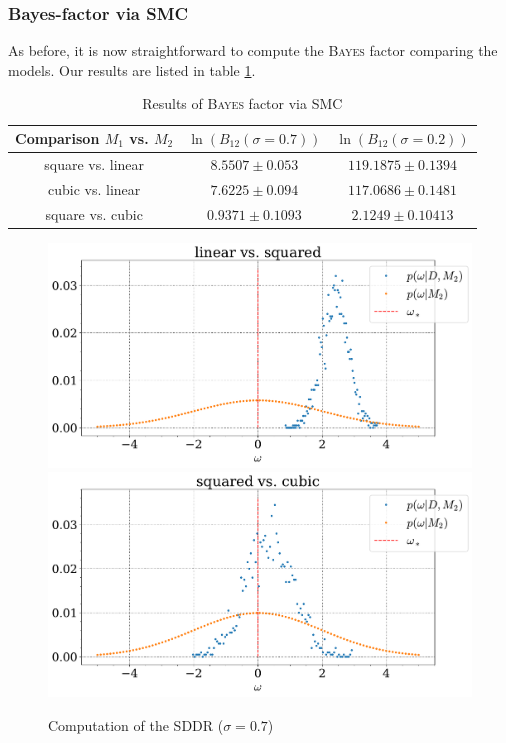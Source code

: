 \documentclass[%
 reprint,
 amsmath,amssymb,
 aps,
]{revtex4-1}
\begin{document}
\subsubsection{\textbf{Bayes-factor via SMC}}
\noindent As before, it is now straightforward to compute the \textsc{Bayes} factor comparing the models. Our results are listed in table \ref{tab:res_smc}.

\begin{table}[H]
	{\renewcommand{\arraystretch}{1.3}
		\begin{tabular}{|c|c|c|}
			\hline
			Comparison $M_1$ vs. $M_2$ & $\ln(B_{12}(\sigma=0.7))$& $\ln(B_{12}(\sigma=0.2))$  \\
			\hline
			square vs. linear& $8.5507\pm0.053$&$119.1875\pm0.1394$\\
			cubic vs. linear & $7.6225\pm0.094$&$117.0686\pm0.1481$\\
			square vs. cubic&$0.9371\pm0.1093$ &$2.1249\pm0.10413$\\
			\hline
	\end{tabular}}
	\caption{Results of \textsc{Bayes} factor via SMC}
	\label{tab:res_smc}
\end{table}

\begin{figure}[H]
	\centering
	\includegraphics[width=0.9\linewidth]{SDDR_linear vs. squared_sigma_07a+.pdf}
	\includegraphics[width=0.9\linewidth]{SDDR_squared vs. cubic_sigma_07a+.pdf}
	\caption{Computation of the SDDR  ($\sigma=0.7$)}
	\label{fig:sddr}
\end{figure}
\end{document}
